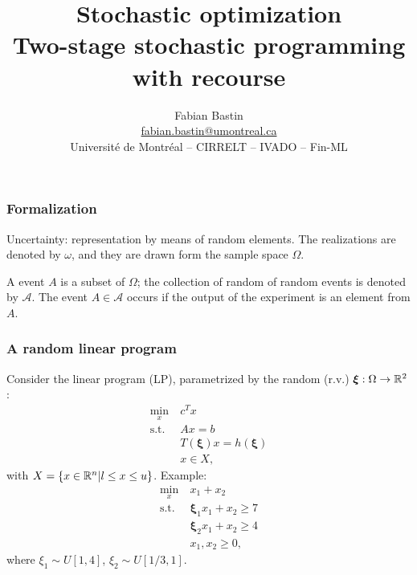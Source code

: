 \documentclass{beamer}
\author[Fabian Bastin]{Fabian Bastin \\ \url{fabian.bastin@umontreal.ca} \\ Université de Montréal -- CIRRELT -- IVADO -- Fin-ML}
\date{}
\title[Two-stage SP]{Stochastic optimization\\Two-stage stochastic programming with recourse}
\def\bxi{\boldsymbol\xi}
\def\bxi{\boldsymbol\xi}
\begin{document}
\frame{\titlepage}

\begin{frame}
	\frametitle{Formalization}
	
	Uncertainty: representation by means of {\red random elements}.
	The realizations are denoted by $\omega$, and they are drawn form the sample space $\Omega$.
	
	\mbox{}
	
	A {\red event} $A$ is a subset of $\Omega$; the collection of random of random events is denoted by $\mathcal{A}$.
	The event $A \in \mathcal{A}$ occurs if the output of the experiment is an element from $A$.
	
\end{frame}

\begin{frame}
	\frametitle{A random linear program}
	
	Consider the linear program (LP), parametrized by the random (r.v.) $\bxi: \Omega \rightarrow \RR^2$:
	\begin{align*}
		\min_x\ & c^T x \\
		\mbox{s.t. } & Ax = b \\
		& T(\bxi)x = h(\bxi) \\
		& x \in X,
	\end{align*}
	with $X = \lbrace x \in {\mathbb{R}}^n | l \leq x \leq u \rbrace$. Example:
	\begin{align*}
		\min_x\ & x_1+x_2\\
		\mbox{s.t. } & \bxi_1x_1 + x_2 \geq 7 \\
		& \bxi_2x_1 + x_2 \geq 4 \\
		& x_1, x_2 \geq 0,
	\end{align*}
	where $\xi_1 \sim U[1,4]$, $\xi_2\sim U[1/3,1]$.
\end{frame}
\end{document}
